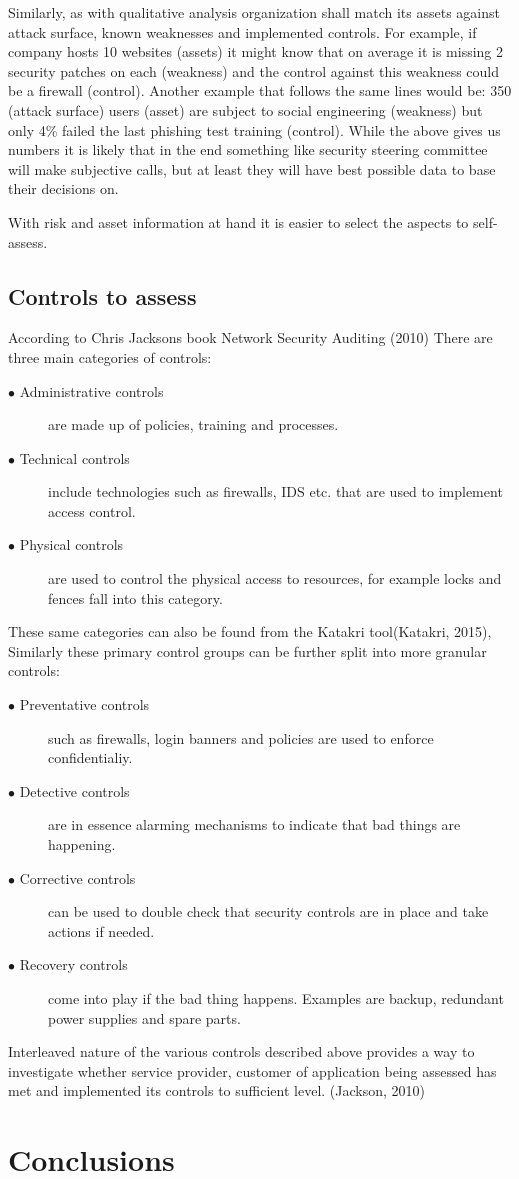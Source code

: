 \documentclass{article}
\begin{document}
Similarly, as with qualitative analysis organization shall match its assets against attack surface, known weaknesses and implemented controls. For example, if company hosts 10 websites (assets) it might know that on average it is missing 2 security patches on each (weakness) and the control against this weakness could be a firewall (control). Another example that follows the same lines would be: 350 (attack surface) users (asset) are subject to social engineering (weakness) but only 4\% failed the last phishing test training (control).
While the above gives us numbers it is likely that in the end something like security steering committee will make subjective calls, but at least they will have best possible data to base their decisions on.
\par
With risk and asset information at hand it is easier to select the aspects to self-assess. 
\subsection{Controls to assess}
According to Chris Jacksons book Network Security Auditing (2010) There are three main categories of controls:
\begin{description}
	\item[$\bullet$ Administrative controls] are made up of policies, training and processes.
	\item[$\bullet$ Technical controls] include technologies such as firewalls, IDS etc. that are used to implement access control.
	\item[$\bullet$ Physical controls] are used to control the physical access to resources, for example locks and fences fall into this category.
\end{description}
These same categories can also be found from the Katakri tool(Katakri, 2015), Similarly these primary control groups can be further split into more granular controls:
\begin{description}
	\item[$\bullet$ Preventative controls] such as firewalls, login banners and policies are used to enforce confidentialiy.
	\item[$\bullet$ Detective controls] are in essence alarming mechanisms to indicate that bad things are happening.
	\item[$\bullet$ Corrective controls] can be used to double check that security controls are in place and take actions if needed.
	\item[$\bullet$ Recovery controls] come into play if the bad thing happens. Examples are backup, redundant power supplies and spare parts.
\end{description}
Interleaved nature of the various controls described above provides a way to investigate whether service provider, customer of application being assessed has met and implemented its controls to sufficient level. (Jackson, 2010)

\section{Conclusions}
\end{document}

